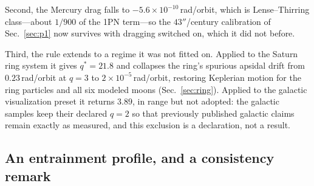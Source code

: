 \documentclass[aps,reprint,amsmath,amssymb,nofootinbib,superscriptaddress,floatfix]{revtex4-2}
\begin{document}
Second, the Mercury drag falls to $-5.6\times10^{-10}$\,rad/orbit,
which is Lense--Thirring class---about $1/900$ of the 1PN term---so
the $43''$/century calibration of Sec.~\ref{sec:p1} now survives with
dragging switched on, which it did not before.

Third, the rule extends to a regime it was not fitted on.
Applied to the Saturn ring system it gives $q^{*}=21.8$ and collapses
the ring's spurious apsidal drift from $0.23$\,rad/orbit at $q=3$ to
$2\times10^{-5}$\,rad/orbit, restoring Keplerian motion for the ring
particles and all six modeled moons (Sec.~\ref{sec:ring}).
Applied to the galactic visualization preset it returns $3.89$, in
range but not adopted: the galactic samples keep their declared $q=2$
so that previously published galactic claims remain exactly as
measured, and this exclusion is a declaration, not a result.

\subsection{An entrainment profile, and a consistency remark}
\label{sec:mm}
\end{document}
